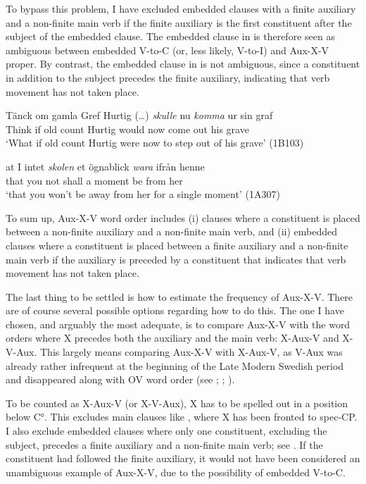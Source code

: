 \documentclass[output=paper, colorlinks, citecolor=brown]{langscibook}
\begin{document}
To bypass this problem, I have excluded embedded clauses with a finite auxiliary and a non-finite main verb if the finite auxiliary is the first constituent after the subject of the embedded clause. The embedded clause in  is therefore seen as ambiguous between embedded V-to-C (or, less likely, V-to-I) and Aux-X-V proper. By contrast, the embedded clause in  is not ambiguous, since a constituent in addition to the subject precedes the finite auxiliary, indicating that verb movement has not taken place.


\ea
\label{ex:sangfelt:24}
\ea\label{ex:sangfelt:24a}
\gll Tänck om gamla Gref {Hurtig (…)} \textit{skulle} {nu} \textit{komma} ur sin graf \\ %
 Think if old count Hurtig would now come out his grave\\
\glt ‘What if old count Hurtig were now to step out of his grave’ (1B103)

\ex\label{ex:sangfelt:24b}
\gll at I {intet} \textit{skolen} {et} {ögnablick} \textit{wara} ifrån henne \\
 that you not shall a moment be from her\\
\glt ‘that you won’t be away from her for a single moment’ (1A307)
\z
\z


To sum up, Aux-X-V word order includes (i) clauses where a constituent is placed between a non-finite auxiliary and a non-finite main verb, and (ii) embedded clauses where a constituent is placed between a finite auxiliary and a non-finite main verb if the auxiliary is preceded by a constituent that indicates that verb movement has not taken place.


The last thing to be settled is how to estimate the frequency of Aux-X-V. There are of course several possible options regarding how to do this. The one I have chosen, and arguably the most adequate, is to compare Aux-X-V with the word orders where X precedes both the auxiliary and the main verb: X-Aux-V and X-V-Aux. This largely means comparing Aux-X-V with X-Aux-V, as V-Aux was already rather infrequent at the beginning of the Late Modern Swedish period and disappeared along with OV word order (see \citealt{Platzack1983}; \citealt{Petzell2011}; \citealt{Sangfelt2019}).



To be counted as X-Aux-V (or X-V-Aux), X has to be spelled out in a position below C°. This excludes main clauses like , where X has been fronted to spec-CP. I also exclude embedded clauses where only one constituent, excluding the subject, precedes a finite auxiliary and a non-finite main verb; see . If the constituent had followed the finite auxiliary, it would not have been considered an unambiguous example of Aux-X-V, due to the possibility of embedded V-to-C.
\end{document}
